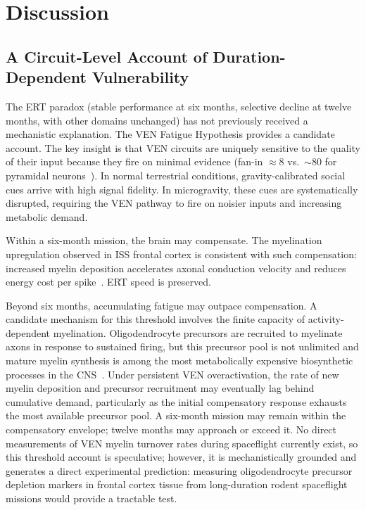 \documentclass[11pt]{article}
\begin{document}
\section{Discussion}

\subsection{A Circuit-Level Account of Duration-Dependent Vulnerability}

The ERT paradox (stable performance at six months, selective decline at
twelve months, with other domains unchanged) has not previously received a
mechanistic explanation.
The VEN Fatigue Hypothesis provides a candidate account.
The key insight is that VEN circuits are uniquely sensitive to the quality
of their input because they fire on minimal evidence (fan-in $\approx$8
vs.\ $\sim$80 for pyramidal neurons~\cite{allman2010}).
In normal terrestrial conditions, gravity-calibrated social cues arrive
with high signal fidelity.
In microgravity, these cues are systematically disrupted, requiring the VEN
pathway to fire on noisier inputs and increasing metabolic demand.

Within a six-month mission, the brain may compensate.
The myelination upregulation observed in ISS frontal cortex is consistent
with such compensation: increased myelin deposition accelerates axonal
conduction velocity and reduces energy cost per spike~\cite{purves2018}.
ERT speed is preserved.

Beyond six months, accumulating fatigue may outpace compensation.
A candidate mechanism for this threshold involves the finite capacity of
activity-dependent myelination.
Oligodendrocyte precursors are recruited to myelinate axons in response to
sustained firing, but this precursor pool is not unlimited and mature myelin
synthesis is among the most metabolically expensive biosynthetic processes
in the CNS~\cite{purves2018}.
Under persistent VEN overactivation, the rate of new myelin deposition and
precursor recruitment may eventually lag behind cumulative demand,
particularly as the initial compensatory response exhausts the most
available precursor pool.
A six-month mission may remain within the compensatory envelope; twelve
months may approach or exceed it.
No direct measurements of VEN myelin turnover rates during spaceflight
currently exist, so this threshold account is speculative; however, it
is mechanistically grounded and generates a direct experimental prediction:
measuring oligodendrocyte precursor depletion markers in frontal cortex
tissue from long-duration rodent spaceflight missions would provide a
tractable test.
\end{document}
